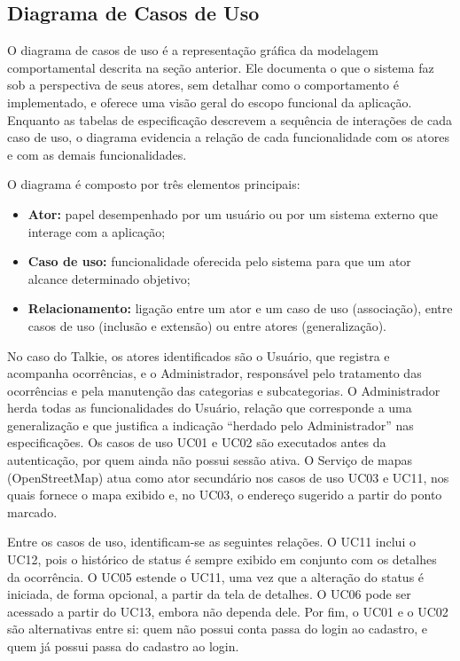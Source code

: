 \documentclass[12pt,a4paper]{article}
\begin{document}
\subsection{Diagrama de Casos de Uso}
O diagrama de casos de uso é a representação gráfica da modelagem comportamental descrita na seção anterior. Ele documenta o que o sistema faz sob a perspectiva de seus atores, sem detalhar como o comportamento é implementado, e oferece uma visão geral do escopo funcional da aplicação. Enquanto as tabelas de especificação descrevem a sequência de interações de cada caso de uso, o diagrama evidencia a relação de cada funcionalidade com os atores e com as demais funcionalidades.

O diagrama é composto por três elementos principais:

\begin{itemize}
\item \textbf{Ator:} papel desempenhado por um usuário ou por um sistema externo que interage com a aplicação;
\item \textbf{Caso de uso:} funcionalidade oferecida pelo sistema para que um ator alcance determinado objetivo;
\item \textbf{Relacionamento:} ligação entre um ator e um caso de uso (associação), entre casos de uso (inclusão e extensão) ou entre atores (generalização).
\end{itemize}

No caso do Talkie, os atores identificados são o Usuário, que registra e acompanha ocorrências, e o Administrador, responsável pelo tratamento das ocorrências e pela manutenção das categorias e subcategorias. O Administrador herda todas as funcionalidades do Usuário, relação que corresponde a uma generalização e que justifica a indicação ``herdado pelo Administrador'' nas especificações. Os casos de uso UC01 e UC02 são executados antes da autenticação, por quem ainda não possui sessão ativa. O Serviço de mapas (OpenStreetMap) atua como ator secundário nos casos de uso UC03 e UC11, nos quais fornece o mapa exibido e, no UC03, o endereço sugerido a partir do ponto marcado.

Entre os casos de uso, identificam-se as seguintes relações. O UC11 inclui o UC12, pois o histórico de status é sempre exibido em conjunto com os detalhes da ocorrência. O UC05 estende o UC11, uma vez que a alteração do status é iniciada, de forma opcional, a partir da tela de detalhes. O UC06 pode ser acessado a partir do UC13, embora não dependa dele. Por fim, o UC01 e o UC02 são alternativas entre si: quem não possui conta passa do login ao cadastro, e quem já possui passa do cadastro ao login.
\end{document}
